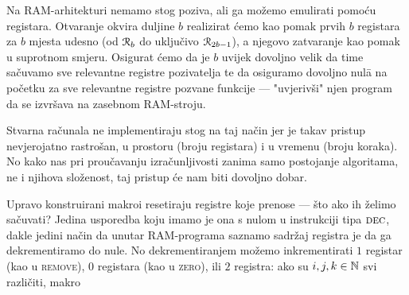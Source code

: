 Na RAM-arhitekturi nemamo stog poziva, ali ga možemo emulirati pomoću registara. Otvaranje okvira duljine $b$ realizirat ćemo kao pomak prvih $b$ registara za $b$ mjesta udesno (od $\mathcal R_{b}$ do uključivo $\mathcal R_{2b-1}$), a njegovo zatvaranje kao pomak u suprotnom smjeru. Osigurat ćemo da je $b$ uvijek dovoljno velik da time sačuvamo sve relevantne registre pozivatelja te da osiguramo dovoljno nul\=a na početku za sve relevantne registre pozvane funkcije --- "uvjerivši" njen program da se izvršava na zasebnom RAM-stroju.

Stvarna računala ne implementiraju stog na taj način jer je takav pristup nevjerojatno rastrošan, u prostoru (broju registara) i u vremenu (broju koraka). No kako nas pri proučavanju izračunljivosti zanima samo postojanje algoritama, ne i njihova složenost, taj pristup će nam biti dovoljno dobar.


Upravo konstruirani makroi resetiraju registre koje prenose --- što ako ih želimo sačuvati? Jedina usporedba koju imamo je ona s nulom u instrukciji tipa $\textsc{dec}$, dakle jedini način da unutar RAM-programa saznamo sadržaj registra je da ga dekrementiramo do nule. No dekrementiranjem možemo inkrementirati $1$ registar (kao u \textsc{remove}), $0$ registara (kao u \textsc{zero}), ili $2$ registra: ako su $i,j,k\in{\mathbb N}$ svi različiti, makro

